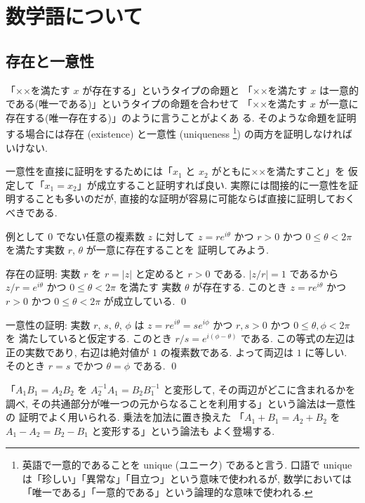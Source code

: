 \documentclass[12pt,twoside]{jarticle}
\begin{document}
\setcounter{section}{0}
\renewcommand\thesection{\Alph{section}}


\section{数学語について}
\label{sec:mathematical-language}


\subsection{存在と一意性}
\label{sec:existence-uniqueness}

「××を満たす $x$ が存在する」というタイプの命題と
「××を満たす $x$ は一意的である(唯一である)」というタイプの命題を合わせて
「××を満たす $x$ が一意に存在する(唯一存在する)」のように言うことがよくあ
る.  そのような命題を証明する場合には存在 (existence) と一意性 (uniqueness%
\footnote{英語で一意的であることを unique (ユニーク) であると言う.
  口語で unique は「珍しい」「異常な」「目立つ」という意味で使われるが, 
  数学においては「唯一である」「一意的である」という論理的な意味で使われる.}) 
の両方を証明しなければいけない.

一意性を直接に証明をするためには「$x_1$ と $x_2$ がともに××を満たすこと」を
仮定して「$x_1=x_2$」が成立すること証明すれば良い.  
実際には間接的に一意性を証明することも多いのだが,
直接的な証明が容易に可能ならば直接に証明しておくべきである.

例として $0$ でない任意の複素数 $z$ に対して $z=re^{i\theta}$ かつ $r>0$ 
かつ $0\le\theta<2\pi$ を満たす実数 $r$, $\theta$ が一意に存在することを
証明してみよう.

存在の証明: 実数 $r$ を $r=|z|$ と定めると $r>0$ である. 
$|z/r|=1$ であるから $z/r=e^{i\theta}$ かつ $0\le\theta<2\pi$ を満たす
実数 $\theta$ が存在する. 
このとき $z=re^{i\theta}$ かつ $r>0$ かつ $0\le\theta<2\pi$ が成立している.
\qed

一意性の証明: 実数 $r$, $s$, $\theta$, $\phi$ 
は $z=re^{i\theta}=se^{i\phi}$ かつ $r,s>0$ かつ $0\le\theta,\phi<2\pi$ を
満たしていると仮定する.  このとき $r/s = e^{i(\phi-\theta)}$ である.  
この等式の左辺は正の実数であり, 右辺は絶対値が $1$ の複素数である.
よって両辺は $1$ に等しい.  そのとき $r=s$ でかつ $\theta=\phi$ である.
\qed

「$A_1B_1=A_2B_2$ を $A_2^{-1}A_1 = B_2B_1^{-1}$ と変形して, 
その両辺がどこに含まれるかを調べ, 
その共通部分が唯一つの元からなることを利用する」という論法は一意性の
証明でよく用いられる.  乗法を加法に置き換えた
「$A_1+B_1=A_2+B_2$ を $A_1 - A_2 = B_2 - B_1$ と変形する」という論法も
よく登場する.
\end{document}
